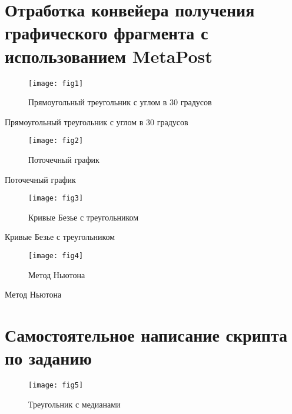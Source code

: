 \tableofcontents

\chapter{Отработка конвейера получения графического фрагмента с использованием MetaPost}

\begin{figure}[h]
    \texttt{[image: fig1]}
    \centering
    \caption{Прямоугольный треугольник с углом в 30 градусов}
\end{figure}

\begin{program}
    
    \caption{Прямоугольный треугольник с углом в 30 градусов}    
\end{program}

\clearpage

\begin{figure}[!h]
    \texttt{[image: fig2]}
    \centering
    \caption{Поточечный график}
\end{figure}

\begin{program}
    
    \caption{Поточечный график}
\end{program}

\clearpage

\begin{figure}[!h]
    \texttt{[image: fig3]}
    \centering
    \caption{Кривые Безье с треугольником}
\end{figure}

\begin{program}
    
    \caption{Кривые Безье с треугольником}
\end{program}

\clearpage

\begin{figure}[!h]
    \texttt{[image: fig4]}
    \centering
    \caption{Метод Ньютона}
\end{figure}

\begin{program}
    
    \caption{Метод Ньютона}
\end{program}

\chapter{Самостоятельное написание скрипта по заданию}

\begin{figure}[!h]
    \texttt{[image: fig5]}
    \centering
    \caption{Треугольник с медианами}
\end{figure}

